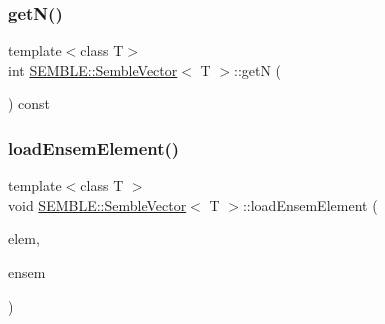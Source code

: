 \subsubsection{\texorpdfstring{getN()}{getN()}\hspace{0.1cm}{\footnotesize\ttfamily [2/2]}}
{\footnotesize\ttfamily template$<$class T$>$ \\
int \mbox{\hyperlink{structSEMBLE_1_1SembleVector}{S\+E\+M\+B\+L\+E\+::\+Semble\+Vector}}$<$ T $>$\+::getN (\begin{DoxyParamCaption}\item[{void}]{ }\end{DoxyParamCaption}) const\hspace{0.3cm}{\ttfamily [inline]}}

\mbox{\label{structSEMBLE_1_1SembleVector_acac507fe462d0c438a429128dfbf0eb1}} 
\subsubsection{\texorpdfstring{loadEnsemElement()}{loadEnsemElement()}\hspace{0.1cm}{\footnotesize\ttfamily [1/2]}}
{\footnotesize\ttfamily template$<$class T $>$ \\
void \mbox{\hyperlink{structSEMBLE_1_1SembleVector}{S\+E\+M\+B\+L\+E\+::\+Semble\+Vector}}$<$ T $>$\+::load\+Ensem\+Element (\begin{DoxyParamCaption}\item[{int}]{elem,  }\item[{const typename \mbox{\hyperlink{structSEMBLE_1_1PromoteEnsem}{Promote\+Ensem}}$<$ T $>$\+::Type \&}]{ensem }\end{DoxyParamCaption})}


